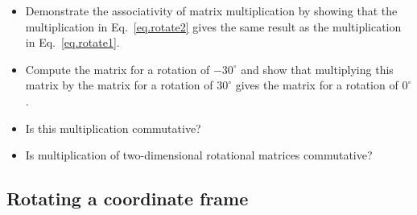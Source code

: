 \begin{framed}
\begin{itemize}
\item Demonstrate the associativity of matrix multiplication by showing that the multiplication in Eq.~\ref{eq.rotate2} gives the same result as the multiplication in Eq.~\ref{eq.rotate1}.
\item Compute the matrix for a rotation of $-30^{\circ}$ and show that multiplying this matrix by the matrix for a rotation of $30^{\circ}$ gives the matrix for a rotation of $0^{\circ}$.
\item Is this multiplication commutative?
\item Is multiplication of two-dimensional rotational matrices commutative?
\end{itemize}
\end{framed}

\subsection{Rotating a coordinate frame}

